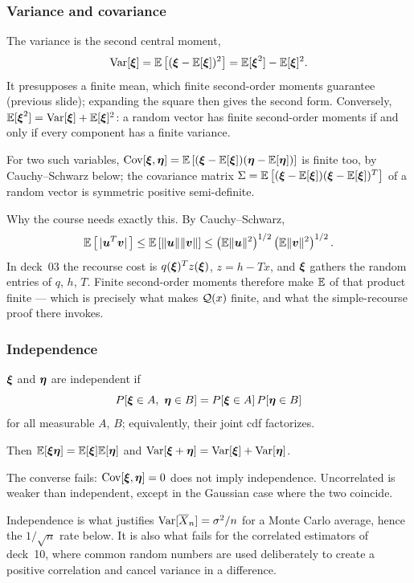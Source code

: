 \documentclass[aspectratio=169]{beamer}
\begin{document}
\begin{frame}
\frametitle{Variance and covariance}
\small

The {\red variance} is the second central moment,
\[
\operatorname{Var}[{\boldsymbol{\xi}}] = {\mathbb{E}}\left[({\boldsymbol{\xi}} - {\mathbb{E}}[{\boldsymbol{\xi}}])^2\right] = {\mathbb{E}}[{\boldsymbol{\xi}}^2] - {\mathbb{E}}[{\boldsymbol{\xi}}]^2.
\]
It presupposes a finite mean, which finite second-order moments guarantee (previous slide); expanding the square then gives the second form.
Conversely, ${\mathbb{E}}[{\boldsymbol{\xi}}^2] = \operatorname{Var}[{\boldsymbol{\xi}}] + {\mathbb{E}}[{\boldsymbol{\xi}}]^2$: a random vector has finite second-order moments {\red if and only if} every component has a finite variance.

\smallskip

For two such variables, $\operatorname{Cov}[{\boldsymbol{\xi}}, {\boldsymbol{\eta}}] = {\mathbb{E}}\left[({\boldsymbol{\xi}} - {\mathbb{E}}[{\boldsymbol{\xi}}])({\boldsymbol{\eta}} - {\mathbb{E}}[{\boldsymbol{\eta}}])\right]$ is finite too, by Cauchy--Schwarz below; the covariance matrix $\Sigma = {\mathbb{E}}\left[({\boldsymbol{\xi}}-{\mathbb{E}}[{\boldsymbol{\xi}}])({\boldsymbol{\xi}}-{\mathbb{E}}[{\boldsymbol{\xi}}])^T\right]$ of a random vector is symmetric positive semi-definite.

\smallskip

{\blue Why the course needs exactly this.} By {\red Cauchy--Schwarz},
\[
{\mathbb{E}}\left[\,|{\boldsymbol{u}}^T{\boldsymbol{v}}|\,\right] \leq {\mathbb{E}}\left[\|{\boldsymbol{u}}\|\|{\boldsymbol{v}}\|\right] \leq \left({\mathbb{E}}\|{\boldsymbol{u}}\|^2\right)^{1/2}\left({\mathbb{E}}\|{\boldsymbol{v}}\|^2\right)^{1/2}.
\]
In deck~03 the recourse cost is $q({\boldsymbol{\xi}})^Tz({\boldsymbol{\xi}})$, $z = h - Tx$, and ${\boldsymbol{\xi}}$ gathers the random entries of $q$, $h$, $T$. Finite second-order moments therefore make ${\mathbb{E}}$ of that product finite --- which is precisely what makes ${\mathcal{Q}}(x)$ finite, and what the simple-recourse proof there invokes.

\end{frame}

\begin{frame}
\frametitle{Independence}

${\boldsymbol{\xi}}$ and ${\boldsymbol{\eta}}$ are {\red independent} if
\[
P[{\boldsymbol{\xi}} \in A,\ {\boldsymbol{\eta}} \in B] = P[{\boldsymbol{\xi}} \in A]\, P[{\boldsymbol{\eta}} \in B]
\]
for all measurable $A$, $B$; equivalently, their joint cdf factorizes.

\mbox{}

Then ${\mathbb{E}}[{\boldsymbol{\xi}} {\boldsymbol{\eta}}] = {\mathbb{E}}[{\boldsymbol{\xi}}]{\mathbb{E}}[{\boldsymbol{\eta}}]$ and $\operatorname{Var}[{\boldsymbol{\xi}} + {\boldsymbol{\eta}}] = \operatorname{Var}[{\boldsymbol{\xi}}] + \operatorname{Var}[{\boldsymbol{\eta}}]$.

\mbox{}

{\red The converse fails}: $\operatorname{Cov}[{\boldsymbol{\xi}},{\boldsymbol{\eta}}] = 0$ does not imply independence. Uncorrelated is weaker than independent, except in the Gaussian case where the two coincide.

\mbox{}

{\footnotesize Independence is what justifies $\operatorname{Var}[\overline{X}_n] = \sigma^2/n$ for a Monte Carlo average, hence the $1/\sqrt{n}$ rate below. It is also what {\red fails} for the correlated estimators of deck~10, where common random numbers are used deliberately to create a positive correlation and cancel variance in a difference.}

\end{frame}
\end{document}
